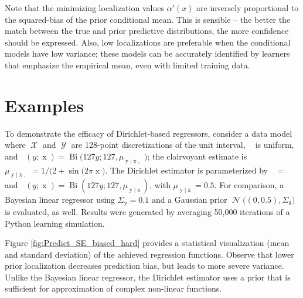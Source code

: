 \documentclass{article}
\DeclareMathOperator{\xrm}{\mathrm{x}}
\DeclareMathOperator{\yrm}{\mathrm{y}}
\DeclareMathOperator{\Xcal}{\mathcal{X}}
\DeclareMathOperator{\Ycal}{\mathcal{Y}}
\DeclareMathOperator{\Ncal}{\mathcal{N}}
\DeclareMathOperator{\Bi}{\mathrm{Bi}}
\DeclareMathOperator{\thetam}{\theta_\text{m}}
\DeclareMathOperator{\thetac}{\theta_\text{c}}
\DeclareMathOperator{\upthetac}{\uptheta_\text{c}}
\DeclareMathOperator{\alpham}{\alpha_\text{m}}
\DeclareMathOperator{\alphac}{\alpha_\text{c}}
\begin{document}
Note that the minimizing localization values $\alpha'(x)$ are inversely proportional to the squared-bias of the prior conditional mean. This is sensible -- the better the match between the true and prior predictive distributions, the more confidence should be expressed. Also, low localizations are preferable when the conditional models have low variance; these models can be accurately identified by learners that emphasize the empirical mean, even with limited training data. 


\section{Examples}
To demonstrate the efficacy of Dirichlet-based regressors, consider a data model where $\Xcal$ and $\Ycal$ are 128-point discretizations of the unit interval, $\thetam$ is uniform, and $\thetac(y; \xrm) = \Bi\big(127y; 127, \mu_{\yrm | \xrm,\upthetac}\big)$; the clairvoyant estimate is $\mu_{\yrm | \xrm,\upthetac} = 1 / \big(2 + \sin(2\pi \xrm\big)$. The Dirichlet estimator is parameterized by $\alpham = \thetam$ and $\alphac(y; \xrm) = \Bi(127y; 127, \mu_{\yrm | \xrm})$, with $\mu_{\yrm | \xrm} = 0.5$. For comparison, a Bayesian linear regressor \cite{theodoridis-ML} using $\Sigma_{\yrm}=0.1$ and a Gaussian prior $\Ncal\big((0, 0.5), \Sigma_{\uptheta}\big)$ is evaluated, as well. Results were generated by averaging 50,000 iterations of a Python learning simulation.

Figure \ref{fig:Predict_SE_biased_hard} provides a statistical visualization (mean and standard deviation) of the achieved regression functions. Observe that lower prior localization decreases prediction bias, but leads to more severe variance. Unlike the Bayesian linear regressor, the Dirichlet estimator uses a prior that is sufficient for approximation of complex non-linear functions.
\end{document}
